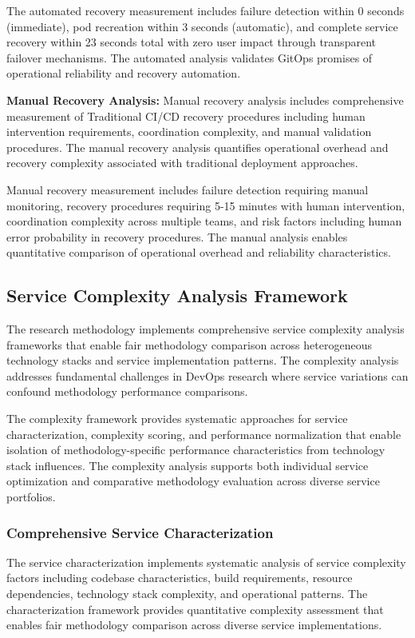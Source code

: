The automated recovery measurement includes failure detection within 0 seconds (immediate), pod recreation within 3 seconds (automatic), and complete service recovery within 23 seconds total with zero user impact through transparent failover mechanisms. The automated analysis validates GitOps promises of operational reliability and recovery automation.

\textbf{Manual Recovery Analysis:}
Manual recovery analysis includes comprehensive measurement of Traditional CI/CD recovery procedures including human intervention requirements, coordination complexity, and manual validation procedures. The manual recovery analysis quantifies operational overhead and recovery complexity associated with traditional deployment approaches.

Manual recovery measurement includes failure detection requiring manual monitoring, recovery procedures requiring 5-15 minutes with human intervention, coordination complexity across multiple teams, and risk factors including human error probability in recovery procedures. The manual analysis enables quantitative comparison of operational overhead and reliability characteristics.

\subsection{Service Complexity Analysis Framework}

The research methodology implements comprehensive service complexity analysis frameworks that enable fair methodology comparison across heterogeneous technology stacks and service implementation patterns. The complexity analysis addresses fundamental challenges in DevOps research where service variations can confound methodology performance comparisons.

The complexity framework provides systematic approaches for service characterization, complexity scoring, and performance normalization that enable isolation of methodology-specific performance characteristics from technology stack influences. The complexity analysis supports both individual service optimization and comparative methodology evaluation across diverse service portfolios.

\subsubsection{Comprehensive Service Characterization}

The service characterization implements systematic analysis of service complexity factors including codebase characteristics, build requirements, resource dependencies, technology stack complexity, and operational patterns. The characterization framework provides quantitative complexity assessment that enables fair methodology comparison across diverse service implementations.

